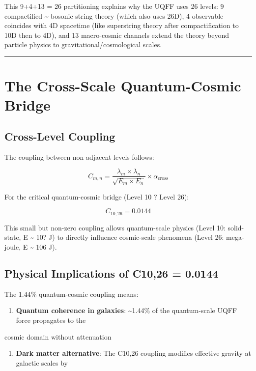 \documentclass[12pt,a4paper]{article}
\begin{document}
This 9+4+13 = 26 partitioning explains why the UQFF uses 26 levels: 9 compactified \textasciitilde{} bosonic string theory (which also uses 26D), 4 observable coincides with 4D spacetime (like superstring theory after compactification to 10D then to 4D), and 13 macro-cosmic channels extend the theory beyond particle physics to gravitational/cosmological scales.

\medskip\hrule\medskip

\section{The Cross-Scale Quantum-Cosmic Bridge}

\subsection{Cross-Level Coupling}

The coupling between non-adjacent levels follows:

\begin{equation}
C_{m,n} = \frac{\lambda_m \times \lambda_n}{\sqrt{E_m \times E_n}} \times \alpha_{\mathrm{cross}}
\end{equation}

For the critical quantum-cosmic bridge (Level 10 ? Level 26):

\begin{equation}
C_{10,26} = 0.0144
\end{equation}

This small but non-zero coupling allows quantum-scale physics (Level 10: solid-state, E \textasciitilde{} 10? J) to directly influence cosmic-scale phenomena (Level 26: mega-joule, E \textasciitilde{} 106 J).

\subsection{Physical Implications of C10,26 = 0.0144}

The 1.44\% quantum-cosmic coupling means:

\begin{enumerate}
  \item \textbf{Quantum coherence in galaxies}: \textasciitilde{}1.44\% of the quantum-scale UQFF force propagates to the
\end{enumerate}

cosmic domain without attenuation

\begin{enumerate}
  \item \textbf{Dark matter alternative}: The C10,26 coupling modifies effective gravity at galactic scales by
\end{enumerate}
\end{document}
